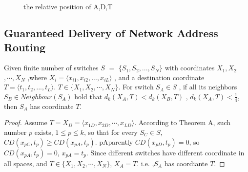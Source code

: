 \documentclass[10pt,conference]{IEEEtran}
\begin{document}
\begin{appendix}
\begin{figure}[!h]
\caption{the relative position of A,D,T}
\end{figure}
\subsection {Guaranteed Delivery of Network Address Routing}

\label{prove:2}
\begin{mydef}
Given finite number of switches $S$ $ =$ $ \{S_1,S_2,...,S_N\}$
with coordinates $X_1,X_2$ $,\cdots,X_N$
,where $X_i = \langle x_{i1}, x_{i2},...,x_{iL} \rangle $
, and a destination coordinate $T = \langle t_1,t_2,...,t_L \rangle $.
$T \in \{ X_1, X_2, \cdots, X_N \}$.
For switch $S_A \in S$ , if all its neighbors $S_B \in Neighbour(S_A)$ hold that
$d_k(X_A,T) < d_k(X_B,T)$ , $d_k(X_A,T)<\frac{1}{4}$,
then $S_A$ has coordinate $T$.
\end{mydef}

\begin{proof}
Assume $T = X_D = \langle x_{1D},x_{2D},\cdots,x_{LD} \rangle$.
According to Theorem A, such number $p$ exists, $1 \leq p \leq k$,
so that
for every $S_C \in S$, $CD(x_{pC},t_p) \geq CD(x_{pA},t_p)$.
pAparently $CD(x_{pD},t_p) = 0$, so $CD(x_{pA},t_p) = 0 $, $x_{pA} = t_p$.
Since different switches have different coordinate in all spaces,
and $T \in \{X_1,X_2, \cdots, X_N\}$,
$X_A = T$. i.e. ,$S_A$ has coordiante $T$.
\end{proof}
\fi
\end{appendix}
\end{document}
